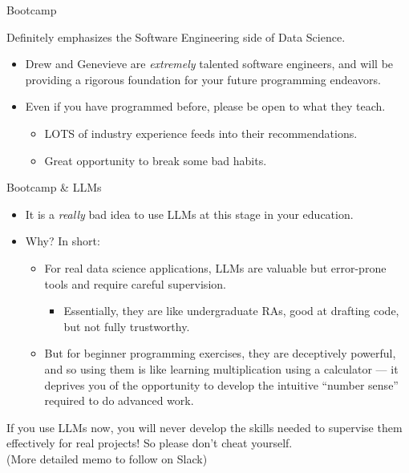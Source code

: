 \documentclass[11pt]{beamer}
\begin{document}
\begin{frame}[c]{Bootcamp}

Definitely emphasizes the Software Engineering side of Data Science.

\begin{itemize}
	\pause \item Drew and Genevieve are \emph{extremely} talented software engineers, and will be providing a rigorous foundation for your future programming endeavors.
	\pause \item Even if you have programmed before, please be open to what they teach.
	\begin{itemize}
		\item LOTS of industry experience feeds into their recommendations.
		\item Great opportunity to break some bad habits.
	\end{itemize}
\end{itemize}

\end{frame}

\begin{frame}[c]{Bootcamp \& LLMs}
\begin{itemize}
	\pause \item It is a \emph{really} bad idea to use LLMs at this stage in your education.
	\pause \item Why? In short: 
	\begin{itemize}
		\pause \item For \alert{real} data science applications, LLMs are \alert{valuable but error-prone} tools and require careful supervision. 
		\begin{itemize}
			\pause \item Essentially, they are like undergraduate RAs, good at drafting code, but not fully trustworthy.
		\end{itemize}
		\pause \item But for beginner programming exercises, they are deceptively powerful, and so using them is like learning multiplication using a calculator — it deprives you of the opportunity to develop the intuitive ``number sense'' required to do advanced work.
	\end{itemize}
\end{itemize}
\pause \alert{If you use LLMs now, you will never develop the skills needed to supervise them effectively for real projects!} So please don't cheat yourself.\\
\pause (More detailed memo to follow on Slack)
\end{frame}

\end{document}
